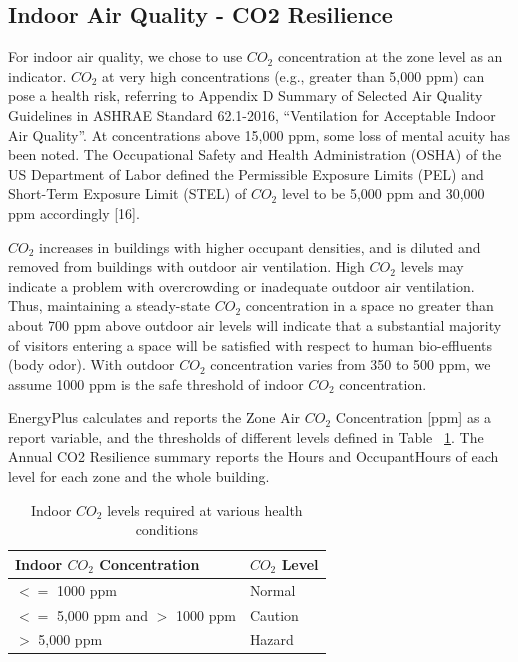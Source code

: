 \subsection{Indoor Air Quality - CO2
Resilience}\label{indoor-air-quality-resilience}

For indoor air quality, we chose to use $CO_2$ concentration at the zone level
as an indicator. $CO_2$ at very high concentrations (e.g., greater than 5,000
ppm) can pose a health risk, referring to Appendix D Summary of Selected Air
Quality Guidelines in ASHRAE Standard 62.1-2016, ``Ventilation for Acceptable
Indoor Air Quality''. At concentrations above 15,000 ppm, some loss of mental
acuity has been noted. The Occupational Safety and Health Administration (OSHA)
of the US Department of Labor defined the Permissible Exposure Limits (PEL) and
Short-Term Exposure Limit (STEL) of $CO_2$ level to be 5,000 ppm and 30,000 ppm
accordingly [16].

$CO_2$ increases in buildings with higher occupant densities, and is diluted and
removed from buildings with outdoor air ventilation. High $CO_2$ levels may
indicate a problem with overcrowding or inadequate outdoor air ventilation.
Thus, maintaining a steady-state $CO_2$ concentration in a space no greater than
about 700 ppm above outdoor air levels will indicate that a substantial majority
of visitors entering a space will be satisfied with respect to human
bio-effluents (body odor). With outdoor $CO_2$ concentration varies from 350 to
500 ppm, we assume 1000 ppm is the safe threshold of indoor $CO_2$
concentration.

EnergyPlus calculates and reports the Zone Air $CO_2$ Concentration [ppm] as a
report variable, and the thresholds of different levels defined in Table
~\ref{table:co2-lvel-chart}. The Annual CO2 Resilience summary reports the Hours
and OccupantHours of each level for each zone and the whole building.

\begin{table} \centering
\caption{Indoor $CO_2$ levels required at various health conditions
\protect \label{table:co2-lvel-chart}} \tabularnewline
\begin{tabular}{ |p{2in}|p{2in}| } \hline \textbf{Indoor $CO_2$ Concentration }
& \textbf{$CO_2$ Level} \\ \hline $<=$ 1000 ppm & Normal \\ \hline $<=$ 5,000
ppm and $>$ 1000 ppm & Caution \\ \hline $>$ 5,000 ppm & Hazard \\ \hline
\end{tabular}
\end{table}

